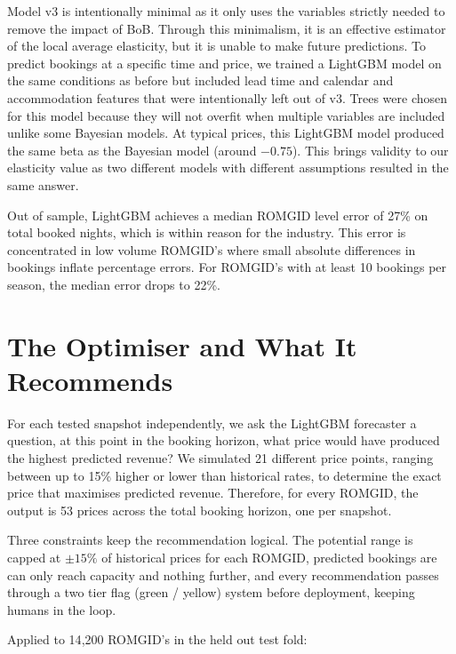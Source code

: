 \documentclass[11pt,a4paper]{article}
\begin{document}
Model v3 is intentionally minimal as it only uses the variables strictly needed to remove the impact of BoB. Through this minimalism, it is an effective estimator of the local average elasticity, but it is unable to make future predictions. To predict bookings at a specific time and price, we trained a LightGBM model on the same conditions as before but included lead time and calendar and accommodation features that were intentionally left out of v3. Trees were chosen for this model because they will not overfit when multiple variables are included unlike some Bayesian models. At typical prices, this LightGBM model produced the same beta as the Bayesian model (around $-0.75$). This brings validity to our elasticity value as two different models with different assumptions resulted in the same answer.

Out of sample, LightGBM achieves a median ROMGID level error of 27\% on total booked nights, which is within reason for the industry. This error is concentrated in low volume ROMGID's where small absolute differences in bookings inflate percentage errors. For ROMGID's with at least 10 bookings per season, the median error drops to 22\%.

\section{The Optimiser and What It Recommends}

For each tested snapshot independently, we ask the LightGBM forecaster a question, at this point in the booking horizon, what price would have produced the highest predicted revenue? We simulated 21 different price points, ranging between up to 15\% higher or lower than historical rates, to determine the exact price that maximises predicted revenue. Therefore, for every ROMGID, the output is 53 prices across the total booking horizon, one per snapshot.

Three constraints keep the recommendation logical. The potential range is capped at $\pm 15\%$ of historical prices for each ROMGID, predicted bookings are can only reach capacity and nothing further, and every recommendation passes through a two tier flag (green / yellow) system before deployment, keeping humans in the loop.

\newpage Applied to 14{,}200 ROMGID's in the held out test fold:
\end{document}
